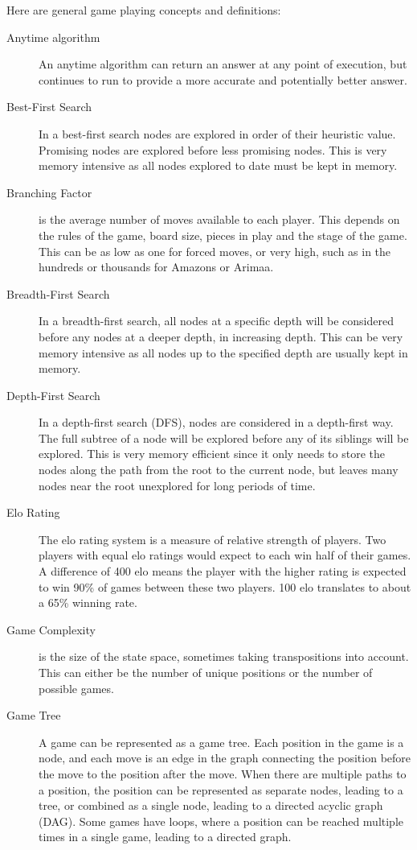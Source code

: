 

Here are general game playing concepts and definitions:

\begin{description}
\item[Anytime algorithm] An anytime algorithm can return an answer at any point of execution, but continues to run to provide a more accurate and potentially better answer.
\item[Best-First Search] In a best-first search nodes are explored in order of their heuristic value. Promising nodes are explored before less promising nodes. This is very memory intensive as all nodes explored to date must be kept in memory.
\item[Branching Factor] is the average number of moves available to each player. This depends on the rules of the game, board size, pieces in play and the stage of the game. This can be as low as one for forced moves, or very high, such as in the hundreds or thousands for Amazons or Arimaa.
\item[Breadth-First Search] In a breadth-first search, all nodes at a specific depth will be considered before any nodes at a deeper depth, in increasing depth. This can be very memory intensive as all nodes up to the specified depth are usually kept in memory.
\item[Depth-First Search] In a depth-first search (DFS), nodes are considered in a depth-first way. The full subtree of a node will be explored before any of its siblings will be explored. This is very memory efficient since it only needs to store the nodes along the path from the root to the current node, but leaves many nodes near the root unexplored for long periods of time.
\item[Elo Rating] The elo rating system is a measure of relative strength of players. Two players with equal elo ratings would expect to each win half of their games. A difference of 400 elo means the player with the higher rating is expected to win 90\% of games between these two players. 100 elo translates to about a 65\% winning rate.
\item[Game Complexity] is the size of the state space, sometimes taking transpositions into account. This can either be the number of unique positions or the number of possible games.
\item[Game Tree] A game can be represented as a game tree. Each position in the game is a node, and each move is an edge in the graph connecting the position before the move to the position after the move. When there are multiple paths to a position, the position can be represented as separate nodes, leading to a tree, or combined as a single node, leading to a directed acyclic graph (DAG). Some games have loops, where a position can be reached multiple times in a single game, leading to a directed graph.

\end{description}
